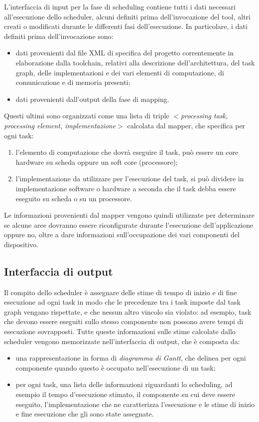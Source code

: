 L'interfaccia di input per la fase di scheduling contiene tutti i dati 
necessari all'esecuzione dello scheduler, alcuni definiti prima 
dell'invocazione del tool, altri creati o modificati durante le differenti fasi 
dell'esecuzione. In particolare, i dati definiti prima dell'invocazione sono:
\begin{itemize}
 \item dati provenienti dal file XML di specifica del progetto correntemente in 
elaborazione dalla toolchain, relativi alla descrizione dell'architettura, del 
task graph, delle implementazioni e dei vari elementi di computazione, di 
comunicazione e di memoria presenti;
 \item dati provenienti dall'output della fase di mapping.
\end{itemize}
Questi ultimi sono organizzati come una lista di triple \emph{$<$processing 
task, processing element, implementazione$>$} calcolata dal mapper, che 
specifica per ogni task:
\begin{enumerate}
 \item l'elemento di computazione che dovrà eseguire il task, può essere un 
core hardware su scheda oppure un soft core (processore);
 \item l'implementazione da utilizzare per l'esecuzione del task, si può 
dividere in implementazione software o hardware a seconda che il task debba 
essere eseguito su scheda o su un processore.
\end{enumerate}

Le informazioni provenienti dal mapper vengono quindi utilizzate per 
determinare se alcune aree dovranno essere riconfigurate durante l'esecuzione 
dell'applicazione oppure no, oltre a dare informazioni sull'occupazione dei 
vari componenti del dispositivo.


\subsection{Interfaccia di output}

Il compito dello scheduler è assegnare delle stime di tempo di inizio e di fine 
esecuzione ad ogni task in modo che le precedenze tra i task imposte dal task 
graph vengano rispettate, e che nessun altro vincolo sia violato: ad esempio, 
task che devono essere eseguiti sullo stesso componente non possono avere tempi 
di esecuzione sovrapposti. Tutte queste informazioni sulle stime calcolate 
dallo scheduler vengono memorizzate nell'interfaccia di output, che è composta 
da:
\begin{itemize}
 \item una rappresentazione in forma di \emph{diagramma di Gantt}, che delinea 
per ogni componente quando questo è occupato nell'esecuzione di un task;
 \item per ogni task, una lista delle informazioni riguardanti lo scheduling, 
ad esempio il tempo d'esecuzione stimato, il componente su cui deve essere 
eseguito, l'implementazione che ne caratterizza l'esecuzione e le stime di 
inizio e fine esecuzione che gli sono state assegnate.
\end{itemize}

